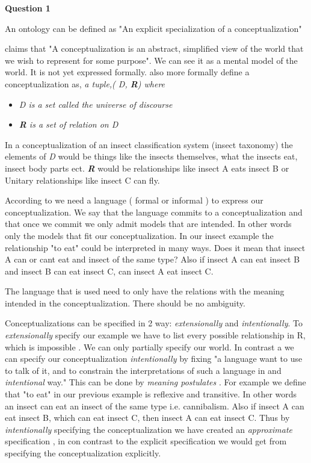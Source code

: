 \documentclass[12pt,a4paper]{article}
\begin{document}
\textbf{Question 1}
\newline

An ontology can be defined as "An explicit specialization of a conceptualization" \cite{Gruber1993}


\cite{Genesereth1987} claims that "A conceptualization is an abstract, simplified view of the world that we wish to represent for some purpose". We can see it as a mental model of the world. It is not yet expressed formally. \cite{Genesereth1987} also more formally define a conceptualization as, \emph{a tuple,( D, \textbf{R}) where}
\begin{itemize}
\item \emph{D is a set called the universe of discourse }
\item \emph{\textbf{R} is a set of relation on D}
\end{itemize}

In a conceptualization of an insect classification system (insect taxonomy) the elements of \emph{D} would be things like the insects themselves, what the insects eat, insect body parts ect. \emph{\textbf{R}} would be relationships like insect A eats insect B or Unitary relationships like insect C can fly.

According to \cite{GuObSt09} we need a language ( formal or informal ) to express our conceptualization. We say that the language commits to a conceptualization and that once we commit we only admit models that are intended\citep[p.8]{GuObSt09}. In other words only the models that fit our conceptualization. In our insect example the relationship "to eat" could be interpreted in many ways. Does it mean that insect A can or cant eat and insect of the same type? Also if insect A can eat insect B and insect B can eat insect C, can insect A eat insect C.

The language that is used need to only have the relations with the meaning intended in the conceptualization. There should be no ambiguity. 

Conceptualizations can be specified in 2 way: \emph{extensionally} and \emph{intentionally}\citep[p.8]{GuObSt09}. To \emph{extensionally} specify our example we have to list every possible relationship in R, which is impossible \cite{GuObSt09}. We can only partially specify our world. 
In contrast a we can specify our conceptualization \emph{intentionally} by fixing "a language want to use to talk of it, and to constrain the interpretations of such a language in and \emph{intentional} way." \citep[p.8]{GuObSt09} This can be done by \emph{meaning postulates} \cite{Nagel1948}. For example we define that "to eat" in our previous example is reflexive and transitive. In other words an insect can eat an insect of the same type i.e. cannibalism. Also if insect A can eat insect B, which can eat insect C, then insect A can eat insect C.
Thus by \emph{intentionally} specifying the conceptualization we have created an \emph{approximate} specification \cite{GuObSt09}, in con contrast to the explicit specification we would get from specifying the conceptualization explicitly. 



\end{document}
